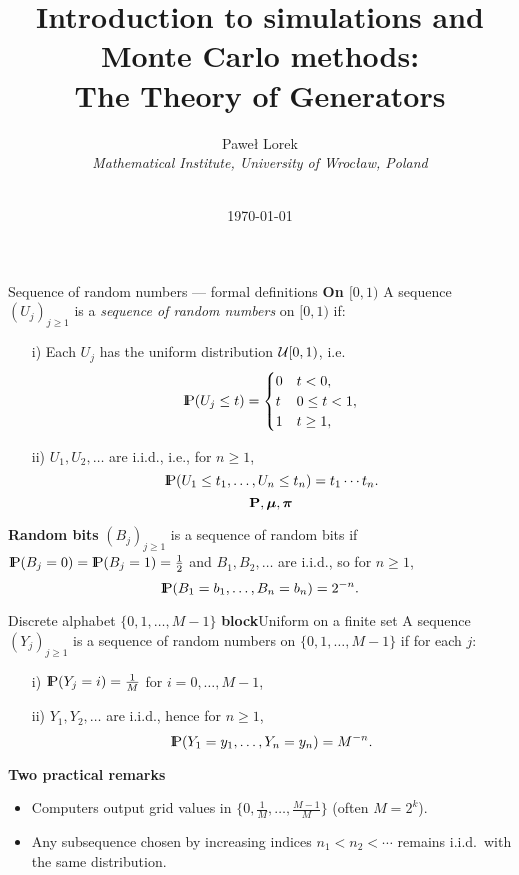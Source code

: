 \documentclass[aspectratio=169]{beamer}
\newcommand{\Prob}{{\rm I\hspace{-0.8mm}P}}
\begin{document}
 

\title{Introduction to simulations and Monte Carlo methods:
\\ The Theory of Generators}
\author{Pawe{\l} Lorek  \\ \textsl{Mathematical Institute, University of Wroc{\l}aw, Poland} \\
\ \\
}


\date{\today}

\frame{\titlepage} 


\begin{frame}{Sequence of random numbers — formal definitions}
\textbf{On $[0,1)$}
A sequence $(U_j)_{j\ge 1}$ is a \textsl{sequence of random numbers} on $[0,1)$ if:
\begin{enumerate}
  \item[i)] Each $U_j$ has the uniform distribution ${\cal U}[0,1)$, i.e.
  \[
    \Prob(U_j \le t) =
    \begin{cases}
      0 & t<0,\\
      t & 0\le t<1,\\
      1 & t\ge 1,
    \end{cases}
  \]
  \item[ii)] $U_1,U_2,\ldots$ are i.i.d., i.e., for $n\ge 1$,
  \[
    \Prob(U_1\le t_1,\ldots,U_n\le t_n)=t_1\cdots t_n .
  \]
  $$\mathbf{P},\mbox{\boldmath $\mu$}, \mbox{\boldmath$\pi$}$$
\end{enumerate}


\smallskip
\textbf{Random bits}
$(B_j)_{j\ge 1}$ is a sequence of random bits if
$\Prob(B_j=0)=\Prob(B_j=1)=\tfrac12$ and $B_1,B_2,\ldots$ are i.i.d., so for $n\ge 1$,
\[
  \Prob(B_1=b_1,\ldots,B_n=b_n)=2^{-n}.
\]

\end{frame}

\begin{frame}{Discrete alphabet $\{0,1,\ldots,M-1\}$}
\textbf{block}{Uniform on a finite set}
A sequence $(Y_j)_{j\ge 1}$ is a sequence of random numbers on
$\{0,1,\ldots,M-1\}$ if for each $j$:
\begin{enumerate}
  \item[i)] $\Prob(Y_j=i)=\tfrac1M$ for $i=0,\ldots,M-1$,
  \item[ii)] $Y_1,Y_2,\ldots$ are i.i.d., hence for $n\ge 1$,
  \[
    \Prob(Y_1=y_1,\ldots,Y_n=y_n)=M^{-n}.
  \]
\end{enumerate}


\smallskip
\textbf{Two practical remarks}
\begin{itemize}
  \item Computers output grid values in $\{0,\tfrac1M,\ldots,\tfrac{M-1}{M}\}$ (often $M=2^k$).
  \item Any subsequence chosen by increasing indices $n_1<n_2<\cdots$ remains i.i.d.\ with the same distribution.
\end{itemize}

\end{frame}
\end{document}
